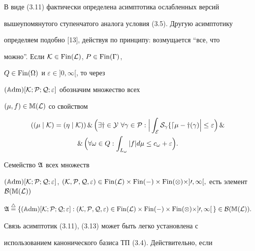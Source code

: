 В виде (3.11) фактически определена асимптотика ослабленных версий


вышеупомянутого ступенчатого аналога условия (3.5). Другую асимптотику


определяем подобно [13], действуя по принципу: возмущается ``все, что


можно''. Если $\cal K\in\operatorname{Fin}(\cal L)$, $P\in\operatorname{Fin}(\Gamma)$,


$Q\in\operatorname{Fin}(\Omega)$ и $\varepsilon\in]0,\infty[$, то через


$(\Bbb A\mathrm{dm})[\cal K;P;Q;\varepsilon]$ обозначим множество всех


$(\mu,f)\in\Bbb M(\cal L)$ со свойством


\begin{multline}


((\mu\mid\cal K)=(\eta\mid\cal K))\,\&\, \Big(\exists y\in Y


\ \forall\gamma\in P:\Big|\int_E S_\gamma f d\mu -


y(\gamma)\Big|\le\varepsilon\Big)\, \& \\


\&\,\Big(\forall\omega\in Q: \int_{L_\omega}|f|d\mu


\le c_\omega+\varepsilon\Big).


\end{multline}


Семейство ${\frak A}$ всех множеств


$(\ADM)[\cal K;P;Q;\varepsilon]$, $(\cal K,P,Q,\varepsilon)\in


\Fin(\cal L)\times\Fin(\Gamma)\times\Fin(\Omega)\times


]0,\infty[,$ есть элемент $\cal B(\Bbb M(\cal L))$


\begin{equation}


\frak A\overset{\triangle}{=}{}\{(\ADM)[\cal K;P;Q;


\varepsilon]:(\cal K,P,Q,\varepsilon)\in\Fin(\cal L)\times


\Fin(\Gamma)\times\Fin(\Omega)


\times ]0,\infty[\,\}


\in\cal B(\Bbb M(\cal L)).


\end{equation}





Связь асимптотик (3.11), (3.13) может быть легко установлена с


использованием канонического базиса ТП (3.4). Действительно, если


